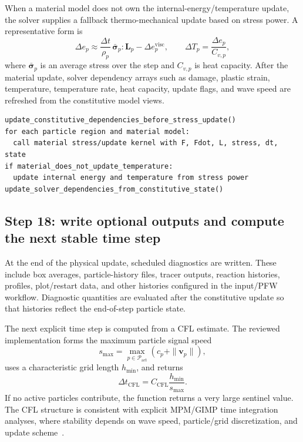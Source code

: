 When a material model does not own the internal-energy/temperature update, the solver supplies a fallback thermo-mechanical update based on stress power.  A representative form is
\begin{equation}
  \Delta e_p \approx \frac{\Delta t}{\rho_p}\,\bar{\boldsymbol{\sigma}}_p:\mathbf{L}_p - \Delta e_p^{\mathrm{visc}},
  \qquad
  \Delta T_p = \frac{\Delta e_p}{C_{v,p}},
\end{equation}
where $\bar{\boldsymbol{\sigma}}_p$ is an average stress over the step and $C_{v,p}$ is heat capacity.  After the material update, solver dependency arrays such as damage, plastic strain, temperature, temperature rate, heat capacity, update flags, and wave speed are refreshed from the constitutive model views.

\begin{lstlisting}[caption={Constitutive and thermal update.},basicstyle=\ttfamily\small]
update_constitutive_dependencies_before_stress_update()
for each particle region and material model:
  call material stress/update kernel with F, Fdot, L, stress, dt, state
if material_does_not_update_temperature:
  update internal energy and temperature from stress power
update_solver_dependencies_from_constitutive_state()
\end{lstlisting}

\subsection{Step 18: write optional outputs and compute the next stable time step}
\label{subsec:solver-step-18}
At the end of the physical update, scheduled diagnostics are written.  These include box averages, particle-history files, tracer outputs, reaction histories, profiles, plot/restart data, and other histories configured in the input/PFW workflow.  Diagnostic quantities are evaluated after the constitutive update so that histories reflect the end-of-step particle state.

The next explicit time step is computed from a CFL estimate.  The reviewed implementation forms the maximum particle signal speed
\begin{equation}
  s_{\max}=\max_{p\in\mathcal{P}_{\mathrm{act}}}\left(c_p+\|\mathbf{v}_p\|\right),
\end{equation}
uses a characteristic grid length $h_{\min}$, and returns
\begin{equation}
  \Delta t_{\mathrm{CFL}} = C_{\mathrm{CFL}}\frac{h_{\min}}{s_{\max}}.
\end{equation}
If no active particles contribute, the function returns a very large sentinel value.  The CFL structure is consistent with explicit MPM/GIMP time integration analyses, where stability depends on wave speed, particle/grid discretization, and update scheme~\cite{wallstedt2008explicit,guilkey2003implicit}.


